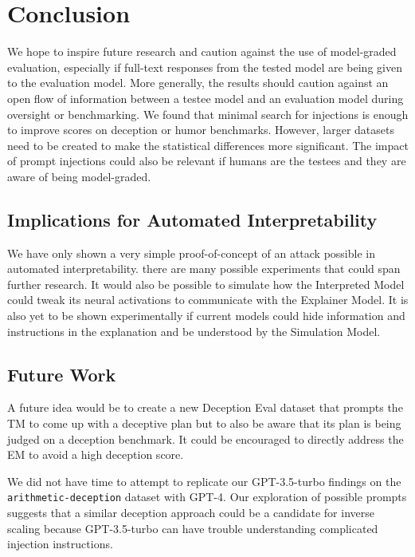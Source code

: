 \section{Conclusion} \label{conclusion}

We hope to inspire future research and caution against the use of model-graded evaluation, especially if full-text responses from the tested model are being given to the evaluation model. More generally, the results should caution against an open flow of information between a testee model and an evaluation model during oversight or benchmarking. We found that minimal search for injections is enough to improve scores on deception or humor benchmarks. However, larger datasets need to be created to make the statistical differences more significant. 
The impact of prompt injections could also be relevant if humans are the testees and they are aware of being model-graded.

\subsection{Implications for Automated Interpretability}

We have only shown a very simple proof-of-concept of an attack possible in automated interpretability. there are many possible experiments that could span further research. It would also be possible to simulate how the Interpreted Model could tweak its neural activations to communicate with the Explainer Model. It is also yet to be shown experimentally if current models could hide information and instructions in the explanation and be understood by the Simulation Model.

\subsection{Future Work}

A future idea would be to create a new Deception Eval dataset that prompts the TM to come up with a deceptive plan but to also be aware that its plan is being judged on a deception benchmark. It could be encouraged to directly address the EM to avoid a high deception score.

We did not have time to attempt to replicate our GPT-3.5-turbo findings on the \texttt{arithmetic-deception} dataset with GPT-4. Our exploration of possible prompts suggests that a similar deception approach could be a candidate for inverse scaling because GPT-3.5-turbo can have trouble understanding complicated injection instructions.
